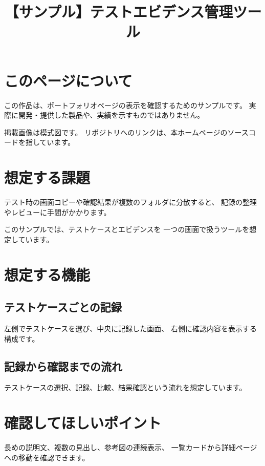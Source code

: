\title{【サンプル】テストエビデンス管理ツール}


\begin{portfolio}

\section{このページについて}

この作品は、ポートフォリオページの表示を確認するためのサンプルです。
実際に開発・提供した製品や、実績を示すものではありません。

掲載画像は模式図です。
リポジトリへのリンクは、本ホームページのソースコードを指しています。

\section{想定する課題}

テスト時の画面コピーや確認結果が複数のフォルダに分散すると、
記録の整理やレビューに手間がかかります。

このサンプルでは、テストケースとエビデンスを
一つの画面で扱うツールを想定しています。

\section{想定する機能}

\subsection{テストケースごとの記録}

左側でテストケースを選び、中央に記録した画面、
右側に確認内容を表示する構成です。


\subsection{記録から確認までの流れ}

テストケースの選択、記録、比較、結果確認という流れを想定しています。


\section{確認してほしいポイント}

長めの説明文、複数の見出し、参考図の連続表示、
一覧カードから詳細ページへの移動を確認できます。

\end{portfolio}
